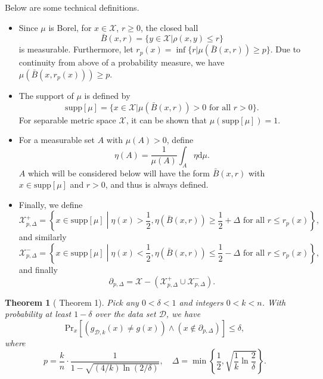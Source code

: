 \documentclass[openany]{book}
\newtheorem{theorem}{Theorem}[chapter]
\theoremstyle{definition}
\theoremstyle{remark}
\begin{document}
Below are some technical definitions.
\begin{itemize}
    \item Since $\mu$ is Borel, for $x\in \mathcal{X}$, $r\ge0$, the closed ball
    \begin{equation*}
        \bar{B}(x,r)=\{y\in \mathcal{X}|\rho(x,y)\le r\}
    \end{equation*}
    is measurable. Furthermore, let $r_p(x)=\inf\{r|\mu(\bar{B}(x,r))\ge p\}$. Due to continuity from above of a probability measure, we have $\mu(\bar{B}(x,r_p(x)))\ge p$.

    \item The support of $\mu$ is defined by
    \begin{equation*}
        \mathrm{supp}[\mu]=\{x\in \mathcal{X}|\mu(\bar{B}(x,r))>0\textrm{ for all }r>0\}.
    \end{equation*}
    For separable metric space $\mathcal{X}$, it can be shown that $\mu(\mathrm{supp}[\mu])=1$.

    \item For a measurable set $A$ with $\mu(A)>0$, define
    \begin{equation*}
        \eta(A)=\frac{1}{\mu(A)}\int_A\eta \mathrm{d}\mu.
    \end{equation*}
    $A$ which will be considered below will have the form $\bar{B}(x,r)$ with $x\in \mathrm{supp}[\mu]$ and $r>0$, and thus is always defined.

    \item Finally, we define
    \begin{equation*}
        \mathcal{X}_{p,\Delta}^+=\left\{x\in \mathrm{supp}[\mu]\middle|\eta(x)>\frac{1}{2},\eta(\bar{B}(x,r))\ge \frac{1}{2}+\Delta\textrm{ for all }r\le r_p(x)\right\},
    \end{equation*}
    and similarly
    \begin{equation*}
        \mathcal{X}_{p,\Delta}^-=\left\{x\in \mathrm{supp}[\mu]\middle|\eta(x)<\frac{1}{2},\eta(\bar{B}(x,r))\le \frac{1}{2}-\Delta\textrm{ for all }r\le r_p(x)\right\},
    \end{equation*}
    and finally
    \begin{equation*}
        \partial_{p,\Delta}=\mathcal{X}-(\mathcal{X}_{p,\Delta}^+\cup \mathcal{X}_{p,\Delta}^-).
    \end{equation*}
\end{itemize}

\begin{theorem}[\cite{CD14} Theorem 1]
    Pick any $0<\delta<1$ and integers $0<k<n$. With probability at least $1-\delta$ over the data set $\mathcal{D}$, we have
    \begin{equation*}
        \mathrm{Pr}_x[(g_{\mathcal{D},k}(x)\ne g(x))\wedge(x\not\in\partial_{p,\Delta})]\le\delta,
    \end{equation*}
    where
    \begin{equation*}
        p=\frac{k}{n}\cdot \frac{1}{1-\sqrt{(4/k)\ln(2/\delta)}},\quad\Delta=\min\left\{\frac{1}{2},\sqrt{\frac{1}{k}\ln \frac{2}{\delta}}\right\}.
    \end{equation*}
\end{theorem}
\end{document}
